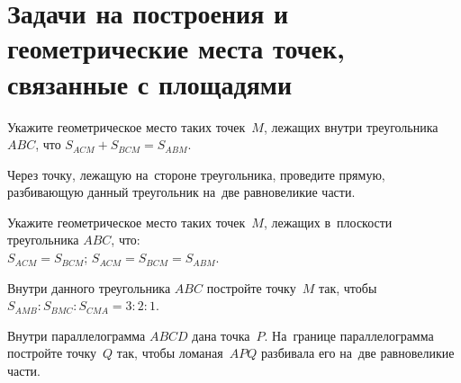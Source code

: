 


\section*{%
Задачи на построения и геометрические места точек, связанные с площадями}




\begin{problems}

\item
Укажите геометрическое место таких точек~$M$, лежащих внутри
треугольника $ABC$, что $S_{ACM} + S_{BCM} = S_{ABM}$.

\item
Через точку, лежащую на~стороне треугольника, проведите прямую, разбивающую
данный треугольник на~две равновеликие части.

\item
Укажите геометрическое место таких точек~$M$, лежащих в~плоскости
треугольника $ABC$, что:
\\
\subproblem $S_{ACM} = S_{BCM}$;
\quad
\subproblem $S_{ACM} = S_{BCM} = S_{ABM}$.

\item
Внутри данного треугольника $ABC$ постройте точку~$M$ так, чтобы
$S_{AMB} : S_{BMC} : S_{CMA} = 3 : 2 : 1$.

\item
Внутри параллелограмма $ABCD$ дана точка~$P$.
На~границе параллелограмма постройте точку~$Q$ так, чтобы ломаная~$APQ$
разбивала его на~две равновеликие части.

\end{problems}

